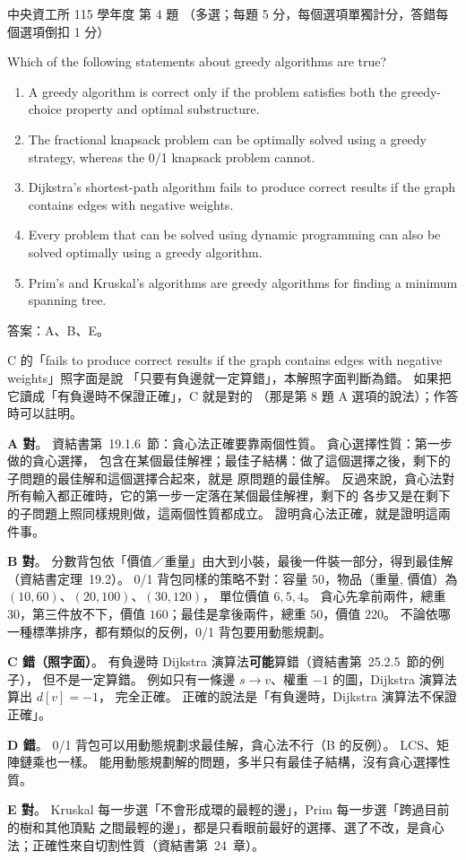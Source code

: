 \begin{pastexam}[label={px:ncu-115-dsa-04}]{中央資工所 115 學年度 第 4 題}
（多選；每題 5 分，每個選項單獨計分，答錯每個選項倒扣 1 分）

Which of the following statements about greedy algorithms are true?
\begin{enumerate}[label=\Alph*.]
\item A greedy algorithm is correct only if the problem satisfies both the greedy-choice property and optimal substructure.
\item The fractional knapsack problem can be optimally solved using a greedy strategy, whereas the 0/1 knapsack problem cannot.
\item Dijkstra's shortest-path algorithm fails to produce correct results if the graph contains edges with negative weights.
\item Every problem that can be solved using dynamic programming can also be solved optimally using a greedy algorithm.
\item Prim's and Kruskal's algorithms are greedy algorithms for finding a minimum spanning tree.
\end{enumerate}
\end{pastexam}

\begin{pastsoln}
答案：A、B、E。

C 的「fails to produce correct results if the graph contains edges with negative weights」照字面是說
「只要有負邊就一定算錯」，本解照字面判斷為錯。 如果把它讀成「有負邊時不保證正確」，C 就是對的
（那是第 8 題 A 選項的說法）；作答時可以註明。

\textbf{A 對}。 資結書第~19.1.6~節：貪心法正確要靠兩個性質。 貪心選擇性質：第一步做的貪心選擇，
包含在某個最佳解裡；最佳子結構：做了這個選擇之後，剩下的子問題的最佳解和這個選擇合起來，就是
原問題的最佳解。 反過來說，貪心法對所有輸入都正確時，它的第一步一定落在某個最佳解裡，剩下的
各步又是在剩下的子問題上照同樣規則做，這兩個性質都成立。 證明貪心法正確，就是證明這兩件事。

\textbf{B 對}。 分數背包依「價值／重量」由大到小裝，最後一件裝一部分，得到最佳解（資結書定理~19.2）。
0/1 背包同樣的策略不對：容量 $50$，物品（重量, 價值）為 $(10, 60)$、$(20, 100)$、$(30, 120)$，
單位價值 $6, 5, 4$。 貪心先拿前兩件，總重 $30$，第三件放不下，價值 $160$；最佳是拿後兩件，總重
$50$，價值 $220$。 不論依哪一種標準排序，都有類似的反例，0/1 背包要用動態規劃。

\textbf{C 錯（照字面）}。 有負邊時 Dijkstra 演算法\textbf{可能}算錯（資結書第~25.2.5~節的例子），
但不是一定算錯。 例如只有一條邊 $s \to v$、權重 $-1$ 的圖，Dijkstra 演算法算出 $d[v] = -1$，
完全正確。 正確的說法是「有負邊時，Dijkstra 演算法不保證正確」。

\textbf{D 錯}。 0/1 背包可以用動態規劃求最佳解，貪心法不行（B 的反例）。 LCS、矩陣鏈乘也一樣。
能用動態規劃解的問題，多半只有最佳子結構，沒有貪心選擇性質。

\textbf{E 對}。 Kruskal 每一步選「不會形成環的最輕的邊」，Prim 每一步選「跨過目前的樹和其他頂點
之間最輕的邊」，都是只看眼前最好的選擇、選了不改，是貪心法；正確性來自切割性質（資結書第~24~章）。
\end{pastsoln}
